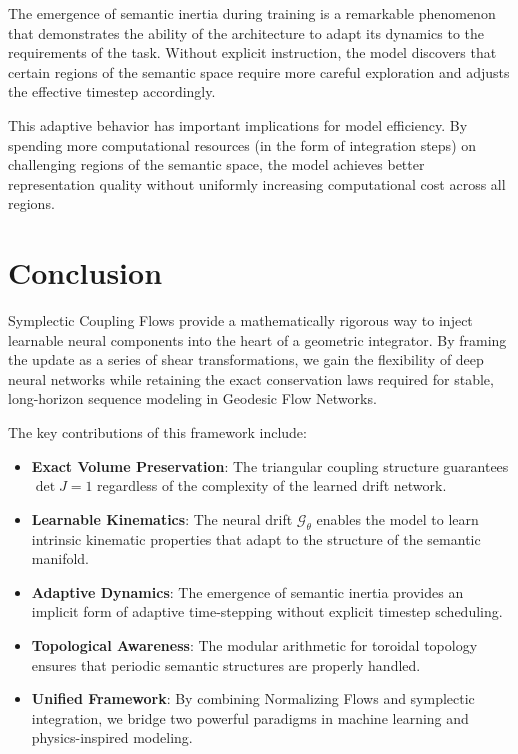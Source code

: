 \documentclass[12pt,a4paper]{article}
\DeclareMathOperator{\det}{det}
\begin{document}
The emergence of semantic inertia during training is a remarkable phenomenon that demonstrates the ability of the architecture to adapt its dynamics to the requirements of the task. Without explicit instruction, the model discovers that certain regions of the semantic space require more careful exploration and adjusts the effective timestep accordingly.

This adaptive behavior has important implications for model efficiency. By spending more computational resources (in the form of integration steps) on challenging regions of the semantic space, the model achieves better representation quality without uniformly increasing computational cost across all regions.

\section{Conclusion}

Symplectic Coupling Flows provide a mathematically rigorous way to inject learnable neural components into the heart of a geometric integrator. By framing the update as a series of shear transformations, we gain the flexibility of deep neural networks while retaining the exact conservation laws required for stable, long-horizon sequence modeling in Geodesic Flow Networks.

The key contributions of this framework include:

\begin{itemize}[leftmargin=1cm]
\item \textbf{Exact Volume Preservation}: The triangular coupling structure guarantees $\det J = 1$ regardless of the complexity of the learned drift network.

\item \textbf{Learnable Kinematics}: The neural drift $\mathcal{G}_\theta$ enables the model to learn intrinsic kinematic properties that adapt to the structure of the semantic manifold.

\item \textbf{Adaptive Dynamics}: The emergence of semantic inertia provides an implicit form of adaptive time-stepping without explicit timestep scheduling.

\item \textbf{Topological Awareness}: The modular arithmetic for toroidal topology ensures that periodic semantic structures are properly handled.

\item \textbf{Unified Framework}: By combining Normalizing Flows and symplectic integration, we bridge two powerful paradigms in machine learning and physics-inspired modeling.
\end{itemize}
\end{document}
